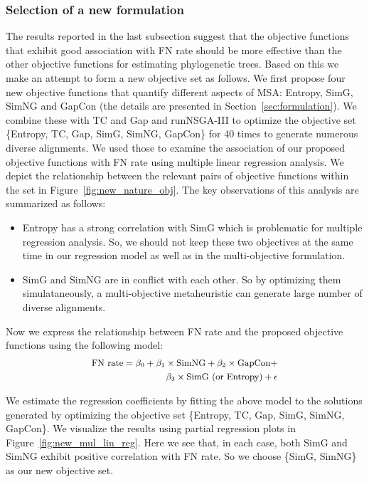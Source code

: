 \subsubsection{Selection of a new formulation}
\label{sec:new_msa_formulation}
The results reported in the last subsection suggest that the objective functions that exhibit good association with FN rate should be more effective than the other objective functions for estimating phylogenetic trees. Based on this we make an attempt to form a new objective set as follows. We first propose four new objective functions that quantify different aspects of MSA: Entropy, SimG, SimNG and GapCon (the details are presented in Section~\ref{sec:formulation}). We combine these with TC and Gap and runNSGA-III to optimize the objective set \{Entropy, TC, Gap, SimG, SimNG, GapCon\} for 40 times to generate numerous diverse alignments. We used those to examine the association of our proposed objective functions with FN rate using multiple linear regression analysis. We depict the relationship between the relevant pairs of objective functions within the set in Figure~\ref{fig:new_nature_obj}. The key observations of this analysis are summarized as follows: 

\begin{itemize}
	\item Entropy has a strong correlation with SimG which is problematic for multiple regression analysis. So, we should not keep these two objectives at the same time in our regression model as well as in the multi-objective formulation.
	
	\item SimG and SimNG are in conflict with each other. So by optimizing them simulataneously, a multi-objective metaheuristic can generate large number of diverse alignments.
\end{itemize}

Now we express the relationship between FN rate and the proposed objective functions using the following model:
\begin{equation}
\small
\begin{split}
\text{FN rate} = \beta_0 + \beta_1 \times \text{SimNG}+ \beta_2 \times \text{GapCon} + \\
\beta_3 \times \text{SimG (or Entropy)} + \epsilon \label{eq:new_multi_lin_reg}
\end{split}
\end{equation}

We estimate the regression coefficients by fitting the above model to the solutions generated by optimizing the objective set \{Entropy, TC, Gap, SimG, SimNG, GapCon\}. We visualize the results using partial regression plots in Figure~\ref{fig:new_mul_lin_reg}. Here we see that, in each case, both SimG and SimNG exhibit positive correlation with FN rate. So we choose \{SimG, SimNG\} as our new objective set.

